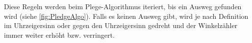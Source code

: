 Diese Regeln werden beim Plege-Algorithmus iteriert, bis ein Ausweg gefunden wird (siehe \autoref{fig:PledgeAlgo}). Falls es keinen Ausweg gibt, wird je nach Definition im Uhrzeigersinn oder gegen den Uhrzeigersinn gedreht und der Winkelzähler immer weiter erhöht bzw. verringert. \cite[S.75 ff]{HandbuchAlgorithmen.2008}\cite[S.250 ff]{AlgoIng.2018}\cite[S.318 ff]{AlgoGeo.2005}
